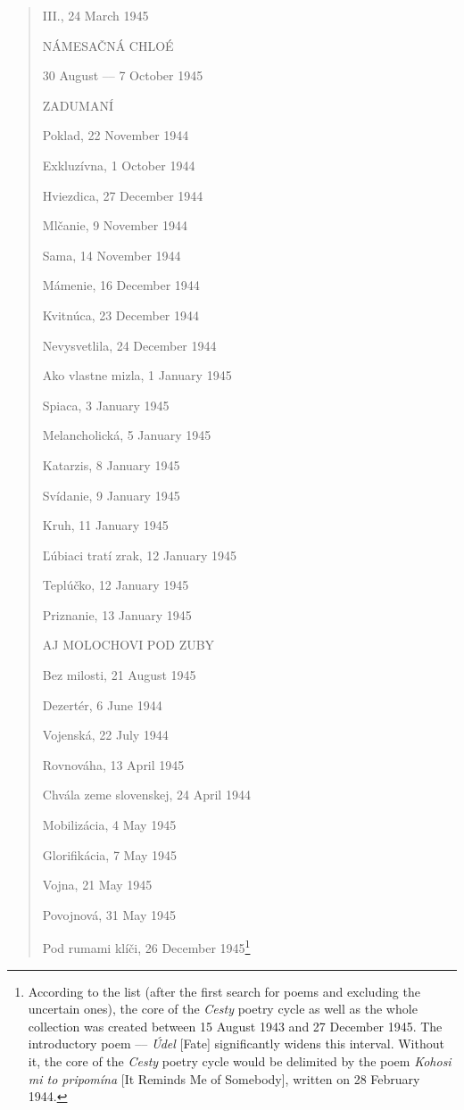 \begin{paper}
\begin{quote}
III., 24 March 1945

\hfill

NÁMESAČNÁ CHLOÉ

30 August –– 7 October 1945

\hfill

ZADUMANÍ

Poklad, 22 November 1944

Exkluzívna, 1 October 1944

Hviezdica, 27 December 1944

Mlčanie, 9 November 1944

Sama, 14 November 1944

Mámenie, 16 December 1944

Kvitnúca, 23 December 1944

Nevysvetlila, 24 December 1944

Ako vlastne mizla, 1 January 1945

Spiaca, 3 January 1945

Melancholická, 5 January 1945

Katarzis, 8 January 1945

Svídanie, 9 January 1945

Kruh, 11 January 1945

Ľúbiaci tratí zrak, 12 January 1945

Teplúčko, 12 January 1945

Priznanie, 13 January 1945

\hfill 

AJ MOLOCHOVI POD ZUBY

Bez milosti, 21 August 1945

Dezertér, 6 June 1944

Vojenská, 22 July 1944

Rovnováha, 13 April 1945

Chvála zeme slovenskej, 24 April 1944

Mobilizácia, 4 May 1945

Glorifikácia, 7 May 1945

Vojna, 21 May 1945

Povojnová, 31 May 1945

Pod rumami klíči, 26 December 1945\footnote{According to the list (after
  the first search for poems and excluding the uncertain ones), the core
  of the \emph{Cesty} poetry cycle as well as the whole collection was
  created between 15 August 1943 and 27 December 1945. The introductory
  poem –– \emph{Údel} [Fate] significantly widens this interval. Without
  it, the core of the \emph{Cesty} poetry cycle would be delimited by
  the poem \emph{Kohosi mi to pripomína} [It Reminds Me of Somebody], written on 28 February 1944.}
\end{quote}



\end{paper}
